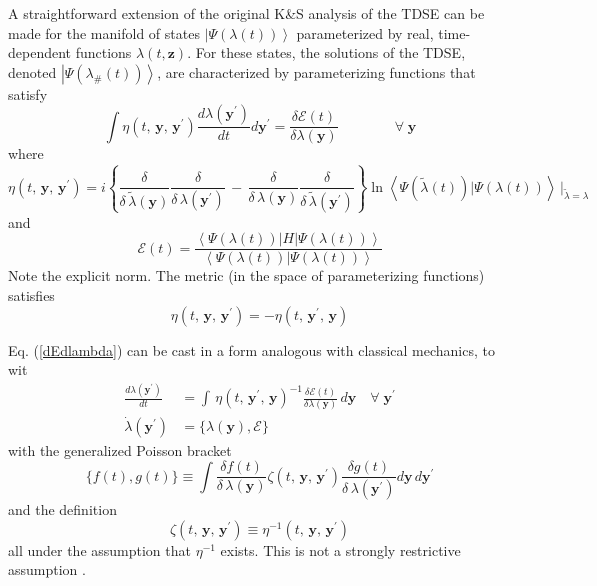 \documentclass[aps,preprint]{revtex4}%
\begin{document}
A straightforward extension of the original K\&S analysis of the TDSE can be
made for the manifold of states $\left|  \Psi(\lambda(t))\right\rangle $
parameterized by real, time-dependent functions $\lambda(t,\mathbf{z})$. For
these states, the solutions of the TDSE, denoted $\left|  \Psi(\lambda
_{\#}(t))\right\rangle $, are characterized by parameterizing functions that
satisfy
\begin{equation}
\int\eta(t,\,\mathbf{y},\,\mathbf{y}^{\prime})\frac{d\lambda(\mathbf{y}%
^{\prime})}{dt}d\mathbf{y}^{\prime}=\frac{\delta\mathcal{E}(t)}{\delta
\lambda(\mathbf{y})}\qquad\qquad\forall\;\mathbf{y} \label{dEdlambda}%
\end{equation}
where
\begin{equation}
\eta(t,\,\mathbf{y},\,\mathbf{y}^{\prime})=i\left\{  \frac{\delta}%
{\delta\,\tilde{\lambda}(\mathbf{y})}\frac{\delta}{\delta\,\lambda
(\mathbf{y}^{\prime})}\,-\,\frac{\delta}{\delta\,\lambda(\mathbf{y})}%
\frac{\delta}{\delta\,\tilde{\lambda}(\mathbf{y}^{\prime})}\right\}
\ln\left\langle \Psi(\tilde{\lambda}(t))|\Psi(\lambda(t))\right\rangle
\,|_{\tilde{\lambda}=\lambda} \label{eta}%
\end{equation}
and
\begin{equation}
\mathcal{E}(t)=\frac{\left\langle \Psi(\lambda(t))|H|\Psi(\lambda
(t))\right\rangle }{\left\langle \Psi(\lambda(t))|\Psi(\lambda
(t))\right\rangle } \label{Eoft}%
\end{equation}
Note the explicit norm. The metric (in the space of parameterizing functions)
satisfies
\begin{equation}
\eta(t,\,\mathbf{y},\,\mathbf{y}^{\prime})=-\eta(t,\,\mathbf{y}^{\prime
},\,\mathbf{y})
\end{equation}


Eq. (\ref{dEdlambda}) can be cast in a form analogous with classical
mechanics, to wit
\begin{align}
\frac{d\lambda(\mathbf{y}^{\prime})}{dt}  &  =\int\,\eta(t,\,\mathbf{y}%
^{\prime},\,\mathbf{y})^{-1}\frac{\delta\mathcal{E}(t)}{\delta\lambda
(\mathbf{y})}\,d\mathbf{y}\quad\forall\;\mathbf{y}^{\prime}\nonumber\\
\dot{\lambda}(\mathbf{y}^{\prime})  &  =\{\lambda(\mathbf{y}),\mathcal{E}\}
\label{genEOM}%
\end{align}
with the generalized Poisson bracket
\begin{equation}
\{f(t),g(t)\}\equiv\int\frac{\delta f(t)}{\delta\,\lambda(\mathbf{y})}%
\zeta(t,\,\mathbf{y},\,\mathbf{y}^{\prime})\frac{\delta g(t)}{\delta
\,\lambda(\mathbf{y}^{\prime})}d\mathbf{y}\,d\mathbf{y}^{\prime}
\label{genPoisson}%
\end{equation}
and the definition
\begin{equation}
\zeta(t,\,\mathbf{y},\,\mathbf{y}^{\prime})\equiv\eta^{-1}(t,\,\mathbf{y}%
,\,\mathbf{y}^{\prime}) \label{etainverse}%
\end{equation}
all under the assumption that $\eta^{-1}$ exists. This is not a strongly
restrictive assumption \cite{etainv}.
\end{document}
